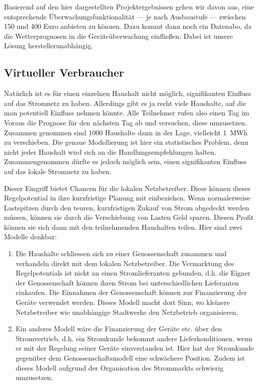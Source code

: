 \documentclass[12pt,BCOR=8.5mm]{scrartcl}
\begin{document}
%
%
%
%

Basierend auf den hier dargestellten Projektergebnissen gehen wir davon
aus, eine entsprechende Überwachungsfunktionalität --- je nach Ausbaustufe ---
zwischen 150 und 400 Euro anbieten zu können. Dazu kommt dann noch ein
Datenabo, da die Wetterprognosen in die Geräteüberwachung einfließen.
Dabei ist unsere Lösung herstellerunabhängig.

\subsection{Virtueller Verbraucher}\label{sub:virtuellerverbraucher}
Natürlich ist es für einen einzelnen Haushalt nicht möglich,
signifikanten Einfluss auf das Stromnetz zu haben. Allerdings gibt es ja
recht viele Haushalte, auf die man potentiell Einfluss nehmen könnte.
Alle Teilnehmer rufen also einen Tag im Voraus die Prognose für den
nächsten Tag ab und versuchen, diese umzusetzen. Zusammen genommen sind
1000 Haushalte dann in der Lage, vielleicht 1~MWh zu verschieben.  Die
genaue Modellierung ist hier ein statistisches Problem, denn nicht jeder
Haushalt wird sich an die Handlungsempfehlungen halten. Zusammengenommen
dürfte es jedoch möglich sein, einen signifikanten Einfluss auf das
lokale Stromnetz zu haben.

Dieser Eingriff bietet Chancen für die lokalen Netzbetreiber. Diese
können dieses Regelpotential in ihre kurzfristige Planung mit
einbeziehen. Wenn normalerweise Lastspitzen durch den teuren,
kurzfristigen Zukauf von Strom abgedeckt werden müssen, können sie durch
die Verschiebung von Lasten Geld sparen. Diesen Profit können sie sich
dann mit den teilnehmenden Haushalten teilen. Hier sind zwei Modelle denkbar: 
\begin{enumerate}
  \item Die Haushalte schliessen sich zu einer Genossenschaft zusammen
    und verhandeln direkt mit dem lokalen Netzbetreiber. Die Vermarktung
    des Regelpotentials ist nicht an einen Stromlieferanten gebunden,
    d.h. die Eigner der Genossenschaft können ihren Strom bei
    unterschiedlichen Lieferanten einkaufen. Die Einnahmen der
    Genossenschaft können zur Finanzierung der Geräte verwendet werden.
    Dieses Modell macht dort Sinn, wo kleinere Netzbetreiber wie
    unabhängige Stadtwerke den Netzbetrieb organisieren.
  \item Ein anderes Modell wäre die Finanzierung der Geräte etc. über
    den Stromvertrieb, d.h. ein Stromkunde bekommt andere
    Lieferkonditionen, wenn er mit der Regelung seiner Geräte
    einverstanden ist. Hier hat der Stromkunde gegenüber dem
    Genossenschaftsmodell eine schwächere Position. Zudem ist dieses
    Modell aufgrund der Organisation des Strommarkts schwierig
    umzusetzen.
\end{enumerate}
\end{document}
